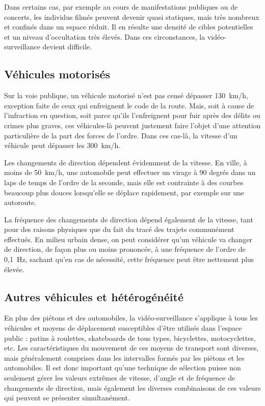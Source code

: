 	Dans certains cas, par exemple au cours de manifestations publiques ou de concerts, les individus filmés peuvent devenir quasi statiques, mais très nombreux et confinés dans un espace réduit. Il en résulte une densité de cibles potentielles et un niveau d'occultation très élevés. Dans ces circonstances, la vidéo-surveillance devient difficile.

	\FloatBarrier \subsection{Véhicules motorisés}
	Sur la voie publique, un véhicule motorisé n'est pas censé dépasser 130~km/h, exception faite de ceux qui enfreignent le code de la route. Mais, soit à cause de l'infraction en question, soit parce qu'ils l'enfreignent pour fuir après des délits ou crimes plus graves, ces véhicules-là peuvent justement faire l'objet d'une attention particulière de la part des forces de l'ordre. Dans ces cas-là, la vitesse d'un véhicule peut dépasser les 300~km/h\footnotemark.
	
	
	Les changements de direction dépendent évidemment de la vitesse. En ville, à moins de 50~km/h, une automobile peut effectuer un virage à 90 degrés dans un laps de temps de l'ordre de la seconde, mais elle est contrainte à des courbes beaucoup plus douces lorsqu'elle se déplace rapidement, par exemple sur une autoroute.
	
	La fréquence des changements de direction dépend également de la vitesse, tant pour des raisons physiques que du fait du tracé des trajets communément effectués. En milieu urbain dense, on peut considérer qu'un véhicule va changer de direction, de façon plus ou moins prononcée, à une fréquence de l'ordre de 0,1~Hz, sachant qu'en cas de nécessité, cette fréquence peut être nettement plus élevée.
	
	\FloatBarrier \subsection{Autres véhicules et hétérogénéité}
	En plus des piétons et des automobiles, la vidéo-surveillance s'applique à tous les véhicules et moyens de déplacement susceptibles d'être utilisés dans l'espace public : patins à roulettes, skateboards de tous types, bicyclettes, motocyclettes, etc. Les caractéristiques du mouvement de ces moyens de transport sont diverses, mais généralement comprises dans les intervalles formés par les piétons et les automobiles. Il est donc important qu'une technique de sélection puisse non seulement gérer les valeurs extrêmes de vitesse, d'angle et de fréquence de changements de direction, mais également les diverses combinaisons de ces valeurs qui peuvent se présenter simultanément.
		
